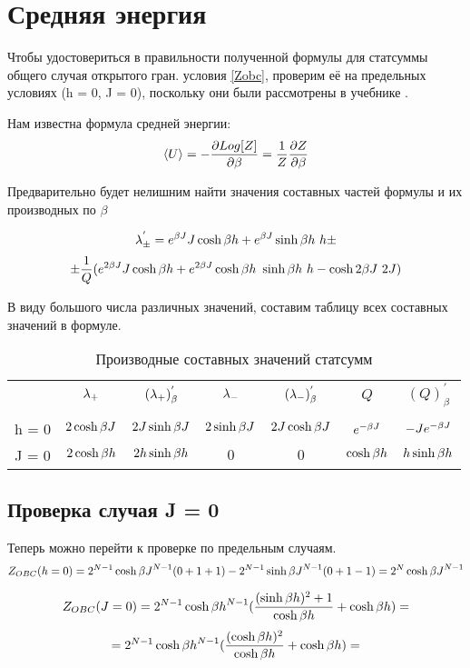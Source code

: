 \section{Средняя энергия}

Чтобы удостовериться в правильности полученной формулы для статсуммы общего случая открытого гран. условия \eqref{Zobc}, проверим её на предельных условиях (h = 0, J = 0), поскольку они были рассмотрены в учебнике \cite{swendsen2020introduction}.

Нам известна формула средней энергии:
\begin{equation}\label{MeanE}
    \langle U \rangle = -\frac{\partial Log[Z]}{\partial \beta} = \frac{1}{Z} \frac{\partial Z}{\partial \beta}
\end{equation}

Предварительно будет нелишним найти значения составных частей формулы и их производных по $\beta$

\[ \lambda_{\pm}^{'} = e^{\beta J}J\cosh{\beta h} + e^{\beta J}\sinh{\beta h}\ h \pm \]
\[\pm \frac{1}{Q}  (e^{2 \beta J}J\cosh{\beta h} + e^{2 \beta J}\cosh{\beta h}\ \sinh{\beta h}\ h - \cosh{2 \beta J}\ 2J) \] 

В виду большого числа различных значений, составим таблицу всех составных значений в формуле.
\begin{table}[h!]\label{derLTab}
    \centering
    \begin{tabular}{c c c c c c c}
         & $\lambda_{+}$ & $(\lambda_{+})^{'}_{\beta}$ & $\lambda_{-}$ & $(\lambda_{-})^{'}_{\beta}$ & $Q$ & $(Q)^{'}_{\beta}$  \\ \\
        h = 0 & $2\cosh{\beta J}$ & $2J\sinh{\beta J}$ & $2\sinh{\beta J}$ & $2J\cosh{\beta J}$ & $e^{-\beta J}$ & $-J e^{-\beta J}$ \\
        J = 0 & $2\cosh{\beta h}$ & $2h\sinh{\beta h}$ & $0$ & $0$ & $\cosh{\beta h}$ & $h\sinh{\beta h}$\\
    \end{tabular}
    \caption{Производные составных значений статсумм}
\end{table}



\subsection{Проверка случая J = 0}

Теперь можно перейти к проверке по предельным случаям.
\[ Z_{OBC}(h = 0) = 2^{N-1}\cosh{\beta J}^{N-1} (0 + 1 + 1) - 2^{N-1}\sinh{\beta J}^{N-1} (0 + 1 - 1) = 2^{N}\cosh{\beta J}^{N-1}\]

\[ Z_{OBC}(J = 0) = 2^{N-1}\cosh{\beta h}^{N-1} (\frac{(\sinh{\beta h})^{2} + 1}{\cosh{\beta h}} +\cosh{\beta h}) = \]
\[=2^{N-1}\cosh{\beta h}^{N-1} (\frac{(\cosh{\beta h})^{2}}{\cosh{\beta h}} +\cosh{\beta h}) = \]

